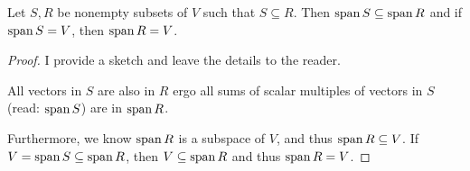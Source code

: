 \begin{proposition}
	Let $S,R$ be nonempty subsets of $V$ such that $S\subseteq R$.
	Then $\operatorname{span} S\subseteq \operatorname{span} R$ and if $\operatorname{span} S=V$, then $\operatorname{span} R=V$.
\end{proposition}
\begin{proof}
	I provide a sketch and leave the details to the reader.

	All vectors in $S$ are also in $R$ ergo all sums of scalar multiples of vectors in $S$ (read: $\operatorname{span} S$) are in $\operatorname{span} R$.

	Furthermore, we know $\operatorname{span} R$ is a subspace of $V$, and thus $\operatorname{span} R\subseteq V$.
	If $V=\operatorname{span} S\subseteq \operatorname{span} R$, then $V\subseteq \operatorname{span} R$ and thus $\operatorname{span} R=V$.
\end{proof}
